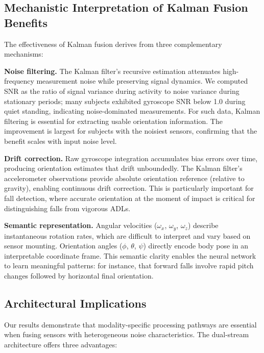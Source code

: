 \subsection{Mechanistic Interpretation of Kalman Fusion Benefits}
\label{subsec:kalman_interpretation}

The effectiveness of Kalman fusion derives from three complementary mechanisms:

\textbf{Noise filtering.} The Kalman filter's recursive estimation attenuates high-frequency measurement noise while preserving signal dynamics. We computed SNR as the ratio of signal variance during activity to noise variance during stationary periods; many subjects exhibited gyroscope SNR below 1.0 during quiet standing, indicating noise-dominated measurements. For such data, Kalman filtering is essential for extracting usable orientation information. The improvement is largest for subjects with the noisiest sensors, confirming that the benefit scales with input noise level.

\textbf{Drift correction.} Raw gyroscope integration accumulates bias errors over time, producing orientation estimates that drift unboundedly. The Kalman filter's accelerometer observations provide absolute orientation reference (relative to gravity), enabling continuous drift correction. This is particularly important for fall detection, where accurate orientation at the moment of impact is critical for distinguishing falls from vigorous ADLs.

\textbf{Semantic representation.} Angular velocities ($\omega_x$, $\omega_y$, $\omega_z$) describe instantaneous rotation rates, which are difficult to interpret and vary based on sensor mounting. Orientation angles ($\phi$, $\theta$, $\psi$) directly encode body pose in an interpretable coordinate frame. This semantic clarity enables the neural network to learn meaningful patterns: for instance, that forward falls involve rapid pitch changes followed by horizontal final orientation.

\subsection{Architectural Implications}
\label{subsec:architecture_implications}

Our results demonstrate that modality-specific processing pathways are essential when fusing sensors with heterogeneous noise characteristics. The dual-stream architecture offers three advantages:

